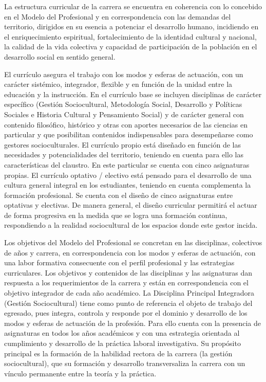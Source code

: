 La estructura curricular de la carrera se encuentra en coherencia con lo concebido en el Modelo del Profesional y en correspondencia con las demandas del territorio, dirigidos en su esencia a potenciar el desarrollo humano, incidiendo en el enriquecimiento espiritual, fortalecimiento de la identidad cultural y nacional, la calidad de la vida colectiva y capacidad de participación de la población en el desarrollo social en sentido general.

El currículo asegura el trabajo con los modos y esferas de actuación, con un carácter sistémico, integrador, flexible y en función de la unidad entre la educación y la instrucción. En el currículo base se incluyen disciplinas de carácter específico (Gestión Sociocultural, Metodología Social, Desarrollo y Políticas Sociales e Historia Cultural y Pensamiento Social) y de carácter general con contenido filosófico, histórico y otras con aportes necesarios de las ciencias en particular y que posibilitan contenidos indispensables para desempeñarse como gestores socioculturales. El currículo propio está diseñado en función de las necesidades y potencialidades del territorio, teniendo en cuenta para ello las características del claustro. En este particular se cuenta con cinco asignaturas propias. El currículo optativo / electivo está pensado para el desarrollo de una cultura general integral en los estudiantes, teniendo en cuenta complementa la formación profesional. Se cuenta con el diseño de cinco asignaturas entre optativas y electivas. De manera general, el diseño curricular permitirá el actuar de forma progresiva en la medida que se logra una formación continua, respondiendo a la realidad sociocultural de los espacios donde este gestor incida. 

Los objetivos del Modelo del Profesional se concretan en las disciplinas, colectivos de años y carrera, en correspondencia con los modos y esferas de actuación, con una labor formativa consecuente con el perfil profesional y las estrategias curriculares. Los objetivos y contenidos de las disciplinas y las asignaturas dan respuesta a los requerimientos de la carrera y están en correspondencia con el objetivo integrador de cada año académico. La Disciplina Principal Integradora (Gestión Sociocultural) tiene como punto de referencia el objeto de trabajo del egresado, pues integra, controla y responde por el dominio y desarrollo de los modos y esferas de actuación de la profesión. Para ello cuenta con la presencia de asignaturas en todos los años académicos y con una estrategia orientada al cumplimiento y desarrollo de la práctica laboral investigativa. Su propósito principal es la formación de la habilidad rectora de la carrera (la gestión sociocultural), que su formación y desarrollo transversaliza la carrera con un vínculo permanente entre la teoría y la práctica.

